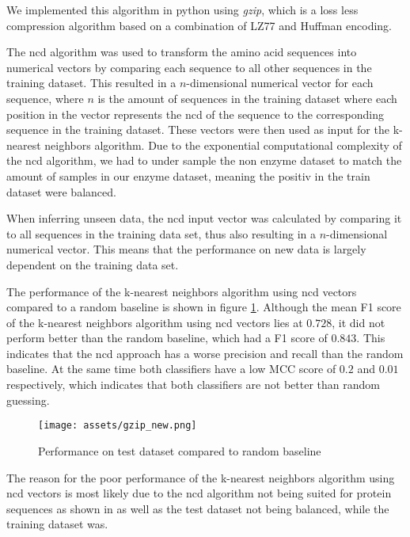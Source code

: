 \documentclass{bioinfo}
\begin{document}
We implemented this algorithm in python using \textit{gzip}, which is a loss less compression algorithm based on a combination of LZ77 and Huffman encoding. \cite{Rigler2007} 

The ncd algorithm was used to transform the amino acid sequences into numerical vectors by comparing each sequence to all other sequences in the training dataset.
This resulted in a $n$-dimensional numerical vector for each sequence, where $n$ is the amount of sequences in the training dataset where each
position in the vector represents the ncd of the sequence to the corresponding sequence in the training dataset.
These vectors were then used as input for the k-nearest neighbors algorithm.
Due to the exponential computational complexity of the ncd algorithm, we had to under sample the non enzyme dataset to match the amount of samples in our enzyme dataset, meaning
the positiv in the train dataset were balanced. 

When inferring unseen data, the ncd input vector was calculated by comparing it to all sequences in the training data set, thus also resulting in a $n$-dimensional numerical vector.
This means that the performance on new data is largely dependent on the training data set.

The performance of the k-nearest neighbors algorithm using ncd vectors compared to a random baseline is shown in figure \ref{fig:gzip_scores}.
Although the mean F1 score of the k-nearest neighbors algorithm using ncd vectors lies at $0.728$, it did not perform better than the random baseline, which had a F1 score of $0.843$.
This indicates that the ncd approach has a worse precision and recall than the random baseline.
At the same time both classifiers have a low MCC 
score of $0.2$ and $0.01$ respectively, which indicates that both classifiers are not better than random guessing.

\begin{figure}[!htbp]
\texttt{[image: assets/gzip\_new.png]}
\caption{Performance on test dataset compared to random baseline}\label{fig:gzip_scores}
\end{figure}

The reason for the poor performance of the k-nearest neighbors algorithm using ncd vectors is
most likely due to the ncd algorithm not being suited for protein sequences as shown in \cite{GzipProteinCompression} as well as
the test dataset not being balanced, while the training dataset was.




 

\end{document}
